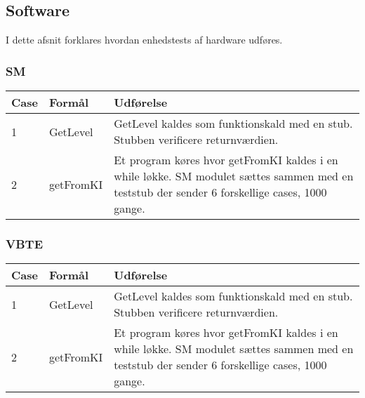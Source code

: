 \subsection{Software}
I dette afsnit forklares hvordan enhedstests af hardware udføres.
\subsubsection{SM}
\begin{table}[H]
\centering
\begin{tabular}{| p{1.2cm}  | p{4.5cm} | p{8cm} |}
\hline
Case &Formål &Udførelse\\\hline
1 &GetLevel &GetLevel kaldes som funktionskald med en stub. Stubben verificere returnværdien.\\\hline
2  &getFromKI &Et program køres hvor getFromKI kaldes i en while løkke. SM modulet sættes sammen med en teststub der sender 6 forskellige cases, 1000 gange.\\\hline
\end{tabular}
\end{table}
\subsubsection{VBTE}
\begin{table}[H]
\centering
\begin{tabular}{| p{1.2cm}  | p{4.5cm} | p{8cm} |}
\hline
Case &Formål &Udførelse\\\hline
1 &GetLevel &GetLevel kaldes som funktionskald med en stub. Stubben verificere returnværdien.\\\hline
2  &getFromKI &Et program køres hvor getFromKI kaldes i en while løkke. SM modulet sættes sammen med en teststub der sender 6 forskellige cases, 1000 gange.\\\hline
\end{tabular}
\end{table}
